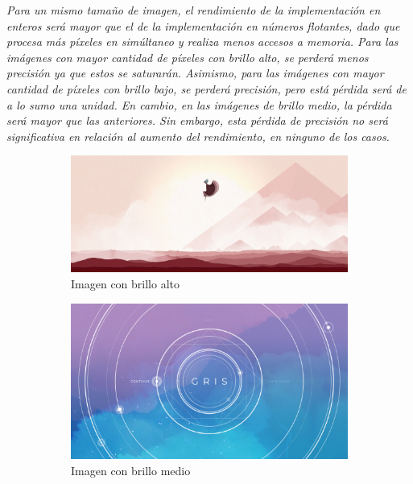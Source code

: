 \documentclass[a4paper]{article}
\begin{document}
\justify
\textit{Para un mismo tamaño de imagen, el rendimiento de la implementación en enteros será mayor que el de la implementación en números flotantes, dado que procesa más píxeles en simúltaneo y realiza menos accesos a memoria. Para las imágenes con mayor cantidad de píxeles con brillo alto, se perderá menos precisión ya que estos se saturarán. Asimismo, para las imágenes con mayor cantidad de píxeles con brillo bajo, se perderá precisión, pero está pérdida será de a lo sumo una unidad. En cambio, en las imágenes de brillo medio, la pérdida será mayor que las anteriores. Sin embargo, esta pérdida de precisión no será significativa en relación al aumento del rendimiento, en ninguno de los casos.}   
\begin{figure}[h]
	\centering
	\begin{subfigure}[b]{0.3 \textwidth}
		\includegraphics[width=\textwidth]{img/bajo1.png}
		\caption{Imagen con brillo alto}
	\end{subfigure}
	\hfill
	\begin{subfigure}[b]{0.3 \textwidth}
		\includegraphics[width=\textwidth]{img/gris5.jpg}
		\caption{Imagen con brillo medio}
	\end{subfigure}
	\hfill
	\begin{subfigure}[b]{0.3 \textwidth}

\end{subfigure}
\end{figure}
\end{document}
